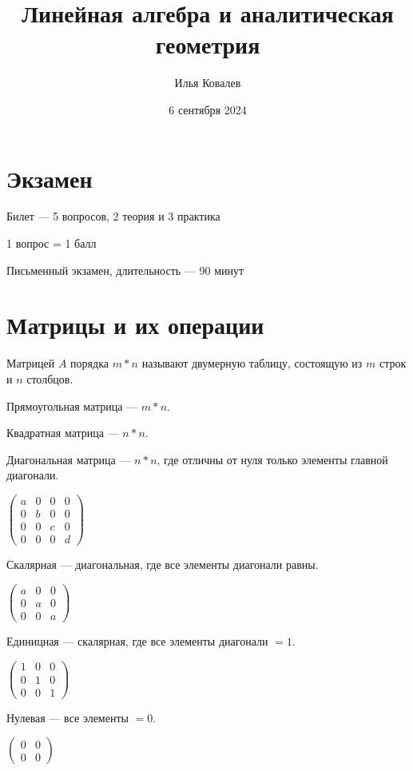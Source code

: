 \documentclass{article}
\begin{document}
\title{Линейная алгебра и аналитическая геометрия}
\author{Илья Ковалев}
\date{6 сентября 2024}
\maketitle

\section{Экзамен}

Билет --- 5 вопросов, 2 теория и 3 практика

1 вопрос = 1 балл

Письменный экзамен, длительность --- 90 минут

\section{Матрицы и их операции}

Матрицей $A$ порядка $m * n$ называют двумерную таблицу, состоящую из $m$ строк и $n$ столбцов.

Прямоугольная матрица --- $m * n$.

Квадратная матрица --- $n * n$.

Диагональная матрица --- $n * n$, где отличны от нуля только элементы главной диагонали.

$
\begin{pmatrix}
	a & 0 & 0 & 0\\
	0 & b & 0 & 0\\
	0 & 0 & c & 0\\
	0 & 0 & 0 & d
\end{pmatrix}
$

Скалярная --- диагональная, где все элементы диагонали равны.

$
\begin{pmatrix}
	a & 0 & 0\\
	0 & a & 0\\
	0 & 0 & a
\end{pmatrix}
$

Единицная --- скалярная, где все элементы диагонали $= 1$.

$
\begin{pmatrix}
	1 & 0 & 0\\
	0 & 1 & 0\\
	0 & 0 & 1
\end{pmatrix}
$

Нулевая --- все элементы $= 0$.

$
\begin{pmatrix}
	0 & 0 \\
	0 & 0
\end{pmatrix}
$
\end{document}
